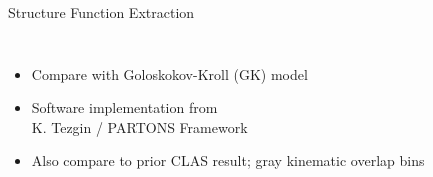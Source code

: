 \documentclass[aspectratio=169]{beamer}
\newcommand*{\myfont}{\fontfamily{lmtt}\selectfont}
\begin{document}
\begin{frame}{Structure Function Extraction}
 \begin{columns}
        \begin{itemize}
                    \setlength\itemsep{1em}
                    \item \footnotesize Compare with Goloskokov-Kroll (GK) model %
                    {\myfont{\tiny [S.V. Goloskokov $\&$ P. Kroll, EPJC, 65,137 (2010)]}}

                    
                    \item Software implementation from\\
                    K. Tezgin / PARTONS Framework\\
                    {\myfont{\tiny [B. Berthou et al., EPJC, 78, 478 (2018)]}}

                    \item Also compare to prior CLAS result; gray kinematic overlap bins
                    \end{itemize}

                     
                    
\end{columns}
\end{frame}
\end{document}
